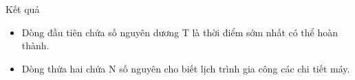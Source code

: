 Kết quả
\begin{itemize}
	\item     Dòng đầu tiên chứa số nguyên dương T là thời điểm sớm nhất có thể hoàn thành.   
	\item     Dòng thứa hai chứa N số nguyên cho biết lịch trình gia công các chi tiết máy.   
\end{itemize}